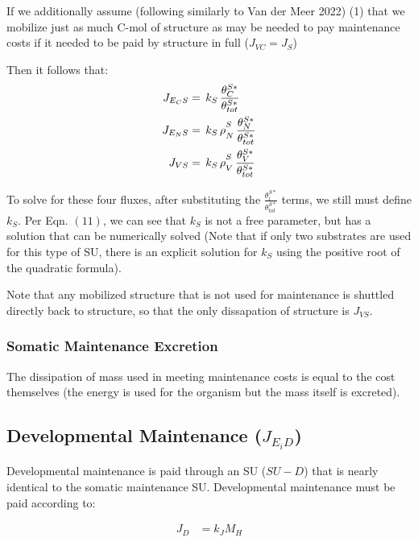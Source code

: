 \documentclass[
]{article}
\begin{document}
If we additionally assume (following similarly to Van der Meer 2022) (1)
that we mobilize just as much C-mol of structure as may be needed to pay
maintenance costs if it needed to be paid by structure in full
(\(J_{VC} = J_S\))

Then it follows that: \begin{align}
J_{{E_C}S} &= \,k_S\,\frac{\theta^{S*}_C}{\theta^{S*}_{tot}} 
\\
J_{{E_N}S} &= \,k_S\,\rho\strut^S_N\,\frac{\theta^{S*}_N}{\theta^{S*}_{tot}}
\\
J_{VS} &= \,k_S\,\rho\strut^S_V\,\frac{\theta^{S*}_V}{\theta^{S*}_{tot}}
\end{align}

To solve for these four fluxes, after substituting the
\(\frac{\theta^{S*}_i}{\theta^{S*}_{tot}}\) terms, we still must define
\(k_S\). Per Eqn. \((11)\), we can see that \(k_S\) is not a free
parameter, but has a solution that can be numerically solved (Note that
if only two substrates are used for this type of SU, there is an
explicit solution for \(k_S\) using the positive root of the quadratic
formula).

Note that any mobilized structure that is not used for maintenance is
shuttled directly back to structure, so that the only dissapation of
structure is \(J_{VS}\).

\subsubsection{Somatic Maintenance
Excretion}\label{somatic-maintenance-excretion}

The dissipation of mass used in meeting maintenance costs is equal to
the cost themselves (the energy is used for the organism but the mass
itself is excreted).

\newpage

\subsection{\texorpdfstring{Developmental Maintenance
(\(J_{E_{i}D}\))}{Developmental Maintenance (J\_\{E\_\{i\}D\})}}\label{developmental-maintenance-j_e_id}

Developmental maintenance is paid through an SU (\(SU-D\)) that is
nearly identical to the somatic maintenance SU. Developmental
maintenance must be paid according to:

\begin{align}
J_D &= k_{\scriptscriptstyle J}M_H
\end{align}
\end{document}
